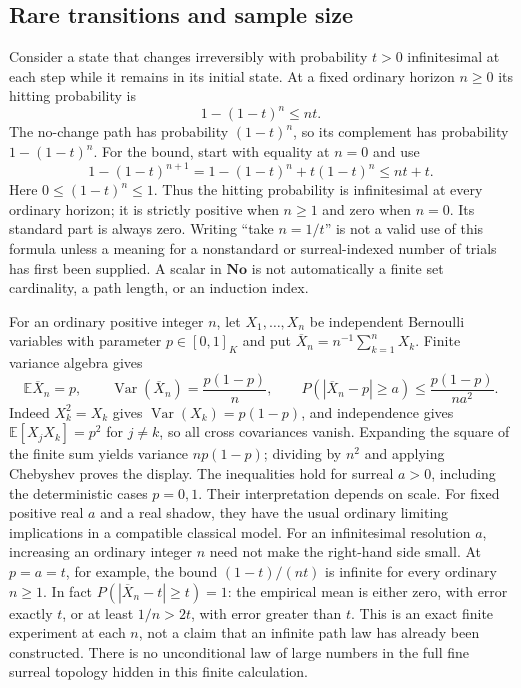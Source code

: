 \documentclass[11pt,a4paper]{article}
\numberwithin{equation}{section}
\theoremstyle{definition}
\theoremstyle{remark}
\newcommand{\No}{\mathbf{No}}
\newcommand{\E}{\mathbb E}
\newcommand{\Var}{\operatorname{Var}}
\begin{document}
\subsection{Rare transitions and sample size}

Consider a state that changes irreversibly with probability $t>0$
infinitesimal at each step while it remains in its initial state.
At a fixed ordinary horizon $n\ge0$ its hitting probability is
\begin{equation}\label{fsp:eq:hitting}
 1-(1-t)^n\le nt.
\end{equation}
The no-change path has probability $(1-t)^n$, so its complement has
probability $1-(1-t)^n$.
For the bound, start with equality at $n=0$ and use
\[
 1-(1-t)^{n+1}=1-(1-t)^n+t(1-t)^n\le nt+t.
\]
Here $0\le(1-t)^n\le1$. Thus the hitting probability is infinitesimal
at every ordinary horizon; it is strictly positive when $n\ge1$ and zero
when $n=0$. Its standard part is always zero.
Writing ``take $n=1/t$'' is not a valid use of this formula unless a
meaning for a nonstandard or surreal-indexed number of trials has first
been supplied. A scalar in $\No$ is not automatically a finite set
cardinality, a path length, or an induction index.

For an ordinary positive integer $n$, let $X_1,\ldots,X_n$ be
independent Bernoulli variables with parameter $p\in[0,1]_K$ and put
$\overline X_n=n^{-1}\sum_{k=1}^nX_k$. Finite variance algebra gives
\begin{equation}
 \E\overline X_n=p,\qquad
 \Var(\overline X_n)=\frac{p(1-p)}{n},\qquad
 P(|\overline X_n-p|\ge a)\le\frac{p(1-p)}{na^2}.
\end{equation}
Indeed $X_k^2=X_k$ gives $\Var(X_k)=p(1-p)$, and independence
gives $\E[X_jX_k]=p^2$ for $j\ne k$, so all cross covariances vanish.
Expanding the square of the finite sum yields variance $np(1-p)$;
dividing by $n^2$ and applying Chebyshev proves the display.
The inequalities hold for surreal $a>0$, including the deterministic
cases $p=0,1$. Their interpretation depends on scale. For fixed positive real $a$ and a real shadow, they have the
usual ordinary limiting implications in a compatible classical model.
For an infinitesimal resolution $a$, increasing an ordinary integer
$n$ need not make the right-hand side small. At $p=a=t$, for example,
the bound $(1-t)/(nt)$ is infinite for every ordinary $n\ge1$.
In fact $P(|\overline X_n-t|\ge t)=1$: the empirical mean is either
zero, with error exactly $t$, or at least $1/n>2t$, with error greater
than $t$. This is an exact finite experiment at each $n$, not a claim
that an infinite path law has already been constructed. There is no unconditional
law of large numbers in the full fine surreal topology hidden in this
finite calculation.
\end{document}
